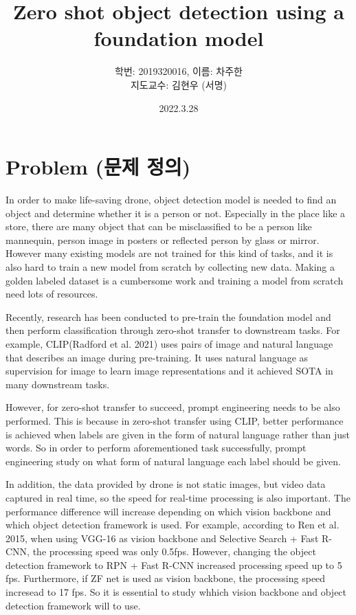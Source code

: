 \documentclass[twocolumn]{article}
\begin{document}
\title{Zero shot object detection using a foundation model}
\author{
    학번: 2019320016, 이름: 차주한 \\
    지도교수: 김현우 (서명)}
\date{2022.3.28}
\maketitle

\section{Problem (문제 정의)}
In order to make life-saving drone, object detection model is needed to find an object and determine whether it is a person or not.
Especially in the place like a store, there are many object that can be misclassified to be a person like mannequin, person image in posters or reflected person by glass or mirror.
However many existing models are not trained for this kind of tasks, and it is also hard to train a new model from scratch by collecting new data.
Making a golden labeled dataset is a cumbersome work and training a model from scratch need lots of resources.

Recently, research has been conducted to pre-train the foundation model and then perform classification through zero-shot transfer to downstream tasks.
For example, CLIP(Radford et al. 2021)\cite{radford2021learning} uses pairs of image and natural language that describes an image during pre-training.
It uses natural language as supervision for image to learn image representations and it achieved SOTA in many downstream tasks.

However, for zero-shot transfer to succeed, prompt engineering needs to be also performed.
This is because in zero-shot transfer using CLIP, better performance is achieved when labels are given in the form of natural language rather than just words.
So in order to perform aforementioned task successfully, prompt engineering study on what form of natural language each label should be given.

In addition, the data provided by drone is not static images, but video data captured in real time, so the speed for real-time processing is also important.
The performance difference will increase depending on which vision backbone and which object detection framework is used.
For example, according to Ren et al. 2015\cite{ren2015faster}, when using VGG-16 as vision backbone and Selective Search + Fast R-CNN, the processing speed was only 0.5fps.
However, changing the object detection framework to RPN + Fast R-CNN increased processing speed up to 5 fps.
Furthermore, if ZF net is used as vision backbone, the processing speed incresead to 17 fps.
So it is essential to study whhich vision backbone and object detection framework will to use.
\end{document}
